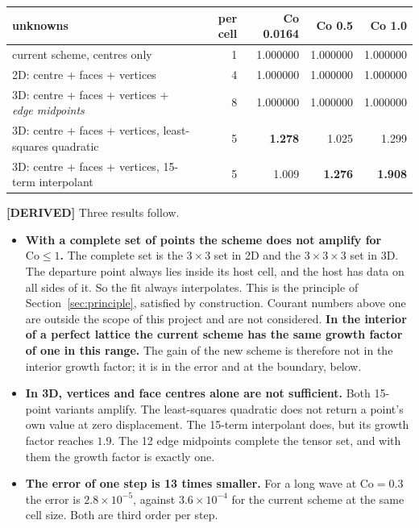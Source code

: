 \documentclass[11pt,a4paper]{article}
\newcommand{\derived}{\textcolor{blue!50!black}{\textbf{[DERIVED]}}}
\begin{document}
\begin{center}
\begin{tabular}{lrrrr}
\toprule
unknowns & per cell & Co 0.0164 & Co 0.5 & Co 1.0 \\
\midrule
current scheme, centres only                         & 1 & 1.000000 & 1.000000 & 1.000000 \\
2D: centre + faces + vertices                        & 4 & 1.000000 & 1.000000 & 1.000000 \\
3D: centre + faces + vertices + \emph{edge midpoints} & 8 & 1.000000 & 1.000000 & 1.000000 \\
3D: centre + faces + vertices, least-squares quadratic & 5 & \textbf{1.278} & 1.025 & 1.299 \\
3D: centre + faces + vertices, 15-term interpolant   & 5 & 1.009 & \textbf{1.276} & \textbf{1.908} \\
\bottomrule
\end{tabular}
\end{center}

\derived{} Three results follow.
\begin{itemize}
\item \textbf{With a complete set of points the scheme does not amplify for
      \(\mathrm{Co} \le 1\).} The complete set is the \(3\times3\) set in 2D and the
      \(3\times3\times3\) set in 3D. The departure point always lies inside its host cell, and
      the host has data on all sides of it. So the fit always interpolates. This is the
      principle of Section~\ref{sec:principle}, satisfied by construction. Courant numbers above
      one are outside the scope of this project and are not considered. \textbf{In the interior
      of a perfect lattice the current scheme has the same growth factor of one in this range.}
      The gain of the new scheme is therefore not in the interior growth factor; it is in the
      error and at the boundary, below.
\item \textbf{In 3D, vertices and face centres alone are not sufficient.} Both 15-point
      variants amplify. The least-squares quadratic does not return a point's own value at zero
      displacement. The 15-term interpolant does, but its growth factor reaches \(1.9\). The
      12 edge midpoints complete the tensor set, and with them the growth factor is exactly
      one.
\item \textbf{The error of one step is 13 times smaller.} For a long wave at
      \(\mathrm{Co} = 0.3\) the error is \(2.8\times10^{-5}\), against \(3.6\times10^{-4}\) for
      the current scheme at the same cell size. Both are third order per step.
\end{itemize}
\end{document}
